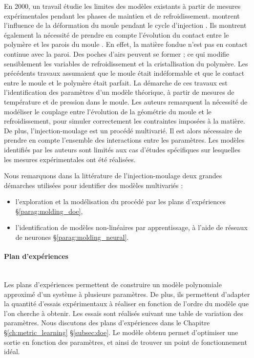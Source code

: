 En 2000, un travail étudie les limites des modèles existants à partir de mesures expérimentales pendant les phases de maintien et de refroidissement.
\citeauthor{delaunay_nature_2000} montrent l'influence de la déformation du moule pendant le cycle d'injection \cite{delaunay_nature_2000}.
Ils montrent également la nécessité de prendre en compte l'évolution du contact entre le polymère et les parois du moule \cite{delaunay_nature_2000a}.
En effet, la matière fondue n'est pas en contact continue avec la paroi.
Des poches d'airs peuvent se former ; ce qui modifie sensiblement les variables de refroidissement et la cristallisation du polymère.
Les précédents travaux assumaient que le moule était indéformable et que le contact entre le moule et le polymère était parfait.
La démarche de ces travaux est l'identification des paramètres d'un modèle théorique, à partir de mesures de température et de pression dans le moule.
Les auteurs remarquent la nécessité de modéliser le couplage entre l'évolution de la géométrie du moule et le refroidissement, pour simuler correctement les contraintes imposées à la matière.
De plus, l'injection-moulage est un procédé multivarié.
Il est alors nécessaire de prendre en compte l'ensemble des interactions entre les paramètres.
Les modèles identifiés par les auteurs sont limités aux cas d'études spécifiques sur lesquelles les mesures expérimentales ont été réalisées.

Nous remarquons dans la littérature de l'injection-moulage deux grandes démarches utilisées pour identifier des modèles multivariés :
\begin{itemize}
\item l'exploration et la modélisation du procédé par les plans d'expériences §\ref{parag:molding_doe},
\item l'identification de modèles non-linéaires par apprentissage, à l'aide de réseaux de neurones §\ref{parag:molding_neural}.
\end{itemize}

\paragraph{Plan d'expériences}\mbox{} \label{parag:molding_doe} \\
Les plans d’expériences permettent de construire un modèle polynomiale approximé d’un système à plusieurs paramètres.
De plus, ils permettent d'adapter la quantité d’essais expérimentaux à réaliser en fonction de l'ordre du modèle que l'on cherche à obtenir.
Les essais sont réalisés suivant une table de variation des paramètres.
Nous discutons des plans d'expériences dans le Chapitre §\ref{ch:metric_learning} §\ref{subsec:doe}.
Le modèle obtenu permet d'optimiser une sortie en fonction des paramètres, et ainsi de trouver un point de fonctionnement idéal.

